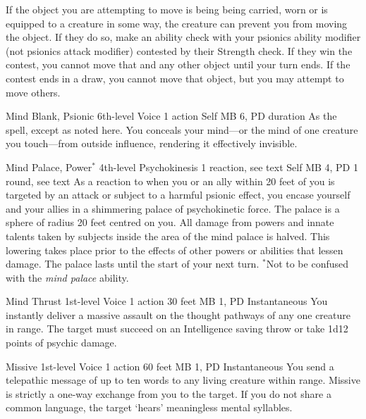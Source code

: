  If the object you are attempting to move is being being carried,
  worn or is equipped to a creature in some way,
  the creature can prevent you from moving the object.
  If they do so, make an ability check with your
  psionics ability modifier (not psionics attack modifier)
  contested by their Strength check.
  If they win the contest, you cannot move that and
  any other object until your turn ends.
  If the contest ends in a draw, you cannot move
  that object, but you may attempt to move others.
  
\DndPowerHeader%
  {Mind Blank, Psionic}
  {6th-level Voice}
  {1 action}
  {Self}
  {MB 6, PD \lvlsix}
  {duration}
As the  spell, except as noted here.
You conceals your mind---or
the mind of one creature you touch---from
outside influence,
rendering it effectively invisible. 

\DndPowerHeader%
  {Mind Palace, Power$^*$}
  {4th-level Psychokinesis}
  {1 reaction, see text}
  {Self}
  {MB 4, PD \lvlfour}
  {1 round, see text}
  As a reaction to when you or an ally within 20 feet of you
  is targeted by an attack or subject to a harmful psionic effect,
  you encase yourself and your allies in a
  shimmering palace of psychokinetic force.
  The palace is a sphere of radius 20 feet centred on you. 
  All damage from powers and innate talents
  taken by subjects inside the area of the mind palace
  is halved.
  This lowering takes place prior to the effects
  of other powers or abilities that lessen damage.
  The palace lasts until the start of your next turn.
  $^*$Not to be confused with the \emph{mind palace} ability.

\DndPowerHeader%
  {Mind Thrust}
  {1st-level Voice}
  {1 action}
  {30 feet}
  {MB 1, PD \lvlone}
  {Instantaneous}
You instantly deliver a massive assault on the thought pathways
of any one creature in range.
The target must succeed on an Intelligence saving throw
or take 1d12 points of psychic damage.

\DndPowerHeader%
  {Missive}
  {1st-level Voice}
  {1 action}
  {60 feet}
  {MB 1, PD \lvlone}
  {Instantaneous}
  You send a telepathic message of up to ten words to
  any living creature within range.
  Missive is strictly a one-way exchange from you to the target.
  If you do not share a common language,
  the target `hears' meaningless mental syllables.

